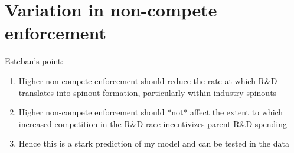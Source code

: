 \documentclass[12pt,english]{article}
\theoremstyle{remark}
\begin{document}
\section{Variation in non-compete enforcement}

Esteban's point:
\begin{enumerate}
	\item Higher non-compete enforcement should reduce the rate at which R\&D translates into spinout formation, particularly within-industry spinouts
	\item Higher non-compete enforcement should *not* affect the extent to which increased competition in the R\&D race incentivizes parent R\&D spending
	\item Hence this is a stark prediction of my model and can be tested in the data
\end{enumerate}
\end{document}
